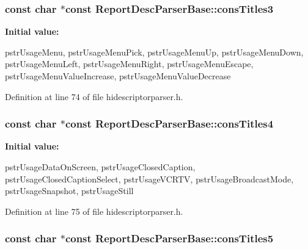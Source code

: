 \hypertarget{class_report_desc_parser_base_ae481ca9afe5a7d500664b6802c985d8b}{
\subsubsection[{cons\-Titles3}]{\setlength{\rightskip}{0pt plus 5cm}const char $\ast$const {\bf \-Report\-Desc\-Parser\-Base\-::cons\-Titles3}}}\label{class_report_desc_parser_base_ae481ca9afe5a7d500664b6802c985d8b}
{\bfseries \-Initial value\-:}
\begin{DoxyCode}
 {
        pstrUsageMenu,
        pstrUsageMenuPick,
        pstrUsageMenuUp,
        pstrUsageMenuDown,
        pstrUsageMenuLeft,
        pstrUsageMenuRight,
        pstrUsageMenuEscape,
        pstrUsageMenuValueIncrease,
        pstrUsageMenuValueDecrease
}
\end{DoxyCode}


\-Definition at line 74 of file hidescriptorparser.\-h.

\hypertarget{class_report_desc_parser_base_ace9cf011244ddade875cb8f2921c3d58}{
\subsubsection[{cons\-Titles4}]{\setlength{\rightskip}{0pt plus 5cm}const char $\ast$const {\bf \-Report\-Desc\-Parser\-Base\-::cons\-Titles4}}}\label{class_report_desc_parser_base_ace9cf011244ddade875cb8f2921c3d58}
{\bfseries \-Initial value\-:}
\begin{DoxyCode}
 {
        pstrUsageDataOnScreen,
        pstrUsageClosedCaption,
        pstrUsageClosedCaptionSelect,
        pstrUsageVCRTV,
        pstrUsageBroadcastMode,
        pstrUsageSnapshot,
        pstrUsageStill
}
\end{DoxyCode}


\-Definition at line 75 of file hidescriptorparser.\-h.

\hypertarget{class_report_desc_parser_base_a0f96db464d287695f7611f38ca9b0058}{
\subsubsection[{cons\-Titles5}]{\setlength{\rightskip}{0pt plus 5cm}const char $\ast$const {\bf \-Report\-Desc\-Parser\-Base\-::cons\-Titles5}}}\label{class_report_desc_parser_base_a0f96db464d287695f7611f38ca9b0058}



